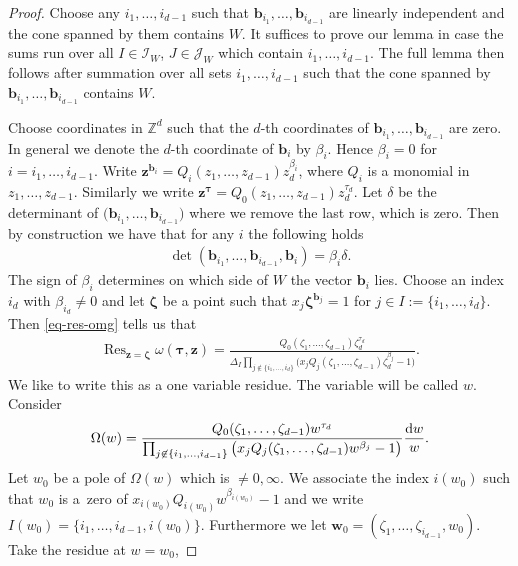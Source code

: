 \documentclass[pdftex]{sigma}
\DeclareMathOperator*{\Res}{Res}
\numberwithin{equation}{section}
\begin{document}
\begin{proof}
Choose any $i_1,\dots,i_{d-1}$ such that $\bm{b}_{i_1},\dots,\bm{b}_{i_{d-1}}$ are linearly independent and the cone spanned by them contains $W$. It suffices to prove
our lemma in case the sums run over all $I\in\mathcal{I}_W$, $J\in\mathcal{J}_W$
which contain $i_1,\dots,i_{d-1}$. The full lemma then follows after summation over
all sets $i_1,\dots,i_{d-1}$ such that the cone spanned by $\bm{b}_{i_1},\dots,
\bm{b}_{i_{d-1}}$ contains $W$.

Choose coordinates in $\mathbb{Z}^d$ such that the $d$-th coordinates of
$\bm{b}_{i_1},\dots,\bm{b}_{i_{d-1}}$ are zero. In gene\-ral we denote the $d$-th
coordinate of $\bm{b}_i$ by $\beta_i$. Hence $\beta_i=0$ for $i=i_1,\dots,i_{d-1}$.
Write $\bm{z}^{\bm{b}_i} = Q_i(z_1,\dots,z_{d-1})z_d^{\beta_i}$, where $Q_i$ is a monomial in $z_1,\dots,z_{d-1}$. Similarly we write $\bm{z}^{\bm\tau}=Q_0(z_1,\dots,z_{d-1})
z_d^{\tau_d}$.
Let $\delta$ be the determinant of $\big(\bm{b}_{i_1},\dots,\bm{b}_{i_{d-1}}\big)$
where we remove the last row, which is zero.
Then by construction we have that for any $i$ the following holds
\begin{gather*}
\det\left(\bm{b}_{i_1},\dots,\bm{b}_{i_{d-1}},\bm{b}_i\right) = \beta_i \delta.
\end{gather*}
The sign of $\beta_i$ determines on which side of $W$ the vector $\bm{b}_i$ lies.
Choose an index $i_d$ with $\beta_{i_d}\ne0$ and let $\bm{\zeta}$ be a point such that
$x_j\bm{\zeta}^{\bm{b}_j} = 1$ for $j \in I:=\{i_1,\dots,i_d\}$. Then \eqref{eq-res-omg} tells us that
\begin{gather}\label{res-at-point}
\Res_{\bm{z}=\bm\zeta}\omega(\bm\tau,\bm{z})
=\frac{Q_0(\zeta_1,\dots,\zeta_{d-1})\zeta_d^{\tau_d}}
{\Delta_I\prod_{j \not \in \{i_1,\dots,i_d\}}
\big(x_jQ_j(\zeta_1,\dots,\zeta_{d-1})\zeta_d^{\beta_j} - 1\big)}.
\end{gather}
We like to write this as a one variable residue. The variable will be called $w$. Consider
\begin{gather*}
\Omega(w)=\frac{Q_0(\zeta_1,\dots,\zeta_{d-1})w^{\tau_d}}
{\prod_{j\not\in\{i_1,\dots,i_{d-1}\}}
\big(x_jQ_j(\zeta_1,\dots,\zeta_{d-1})w^{\beta_j}-1\big)}\frac{{\rm d}w}{w}.
\end{gather*}
Let $w_0$ be a pole of $\Omega(w)$ which is $\ne0,\infty$. We associate the index $i(w_0)$
such that $w_0$ is a~zero of $x_{i(w_0)}Q_{i(w_0)}w^{\beta_{i(w_0)}}-1$ and we write
$I(w_0)=\{i_1,\dots,i_{d-1},i(w_0)\}$. Furthermore we let $\bm{w}_0=
(\zeta_1,\dots,\zeta_{i_{d-1}},w_0)$. Take the residue at $w=w_0$,

\end{proof}
\end{document}
